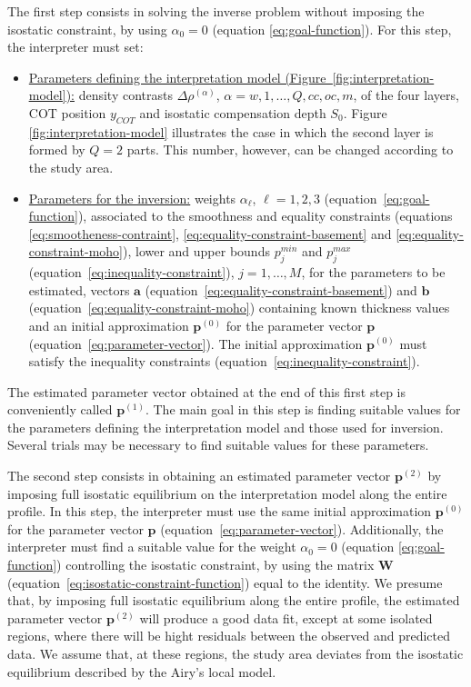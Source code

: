 \documentclass[manuscript]{geophysics}
\begin{document}
The first step consists in solving the inverse problem without imposing the isostatic
constraint, by using $\alpha_{0} = 0$ (equation \ref{eq:goal-function}). For this step,
the interpreter must set:
\begin{itemize}
	\item \underline{Parameters defining the interpretation model
	(Figure~\ref{fig:interpretation-model}):} density contrasts $\Delta \rho^{(\alpha)}$, 
	$\alpha = w, 1, \dots, Q, cc, oc, m$, of the four layers, COT position $y_{COT}$ and
	isostatic compensation depth $S_{0}$. Figure \ref{fig:interpretation-model} illustrates 
	the case in which the second layer is formed by $Q = 2$ parts. This number, however, 
	can be changed according to the study area.
	\item \underline{Parameters for the inversion:} weights $\alpha_{\ell}$,
	$\ell = 1, 2, 3$ (equation~\ref{eq:goal-function}), associated to the 
	smoothness and equality constraints (equations \ref{eq:smootheness-contraint},
	\ref{eq:equality-constraint-basement} and \ref{eq:equality-constraint-moho}),
	lower and upper bounds $p_{j}^{min}$ and $p_{j}^{max}$
	(equation~\ref{eq:inequality-constraint}), $j = 1, \dots, M$,
	for the parameters to be estimated, vectors $\mathbf{a}$ 
	(equation~\ref{eq:equality-constraint-basement}) and $\mathbf{b}$
	(equation~\ref{eq:equality-constraint-moho}) containing known thickness values
	and an initial approximation $\mathbf{p}^{(0)}$ for the parameter vector $\mathbf{p}$
	(equation~\ref{eq:parameter-vector}). The initial approximation $\mathbf{p}^{(0)}$
	must satisfy the inequality constraints (equation~\ref{eq:inequality-constraint}).
\end{itemize}
The estimated parameter vector obtained at the end of this first step is conveniently called
$\mathbf{p}^{(1)}$. The main goal in this step is finding suitable values for the parameters
defining the interpretation model and those used for inversion. Several trials may be
necessary to find suitable values for these parameters. 

The second step consists in obtaining an estimated parameter vector $\mathbf{p}^{(2)}$
by imposing full isostatic equilibrium on the interpretation model along the entire profile.
In this step, the interpreter must use the same initial approximation $\mathbf{p}^{(0)}$
for the parameter vector $\mathbf{p}$ (equation~\ref{eq:parameter-vector}). 
Additionally, the interpreter must find a suitable 
value for the weight $\alpha_{0} = 0$ (equation \ref{eq:goal-function}) controlling the 
isostatic constraint, by using the matrix $\mathbf{W}$
(equation~\ref{eq:isostatic-constraint-function}) equal to the identity.
We presume that, by imposing full isostatic equilibrium along the entire profile,
the estimated parameter vector $\mathbf{p}^{(2)}$ will produce a good data fit,
except at some isolated regions, where there will be hight residuals between the
observed and predicted data. We assume that, at these regions, the study area deviates
from the isostatic equilibrium described by the Airy's local model.
\end{document}
